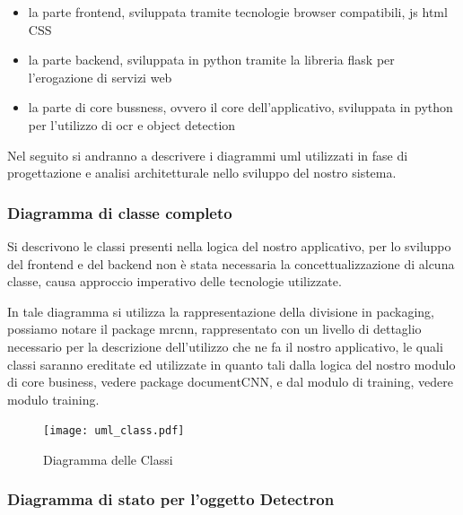 \documentclass[12pt,a4paper]{article}
\begin{document}
\begin{itemize}
    \item la parte frontend, sviluppata tramite tecnologie browser
        compatibili, js html CSS
    \item la parte backend, sviluppata in python tramite la libreria
        flask per l'erogazione di servizi web
    \item la parte di core bussness, ovvero il core dell'applicativo,
        sviluppata in python per l'utilizzo di ocr e object
        detection
\end{itemize}

Nel seguito si andranno a descrivere i diagrammi uml utilizzati in fase
di progettazione e analisi architetturale nello sviluppo del nostro
sistema.


\subsubsection{Diagramma di classe completo}

Si descrivono le classi presenti nella logica del nostro applicativo,
per lo sviluppo del frontend e del backend non è stata necessaria la
concettualizzazione di alcuna classe, causa approccio imperativo delle
tecnologie utilizzate.

In tale diagramma si utilizza la rappresentazione della divisione in
packaging, possiamo notare il package mrcnn, rappresentato con un livello di dettaglio
necessario per la descrizione dell'utilizzo che ne fa il nostro
applicativo, le quali classi saranno ereditate ed utilizzate in quanto
tali dalla logica del nostro modulo di core business, vedere package
documentCNN, e dal modulo di training, vedere modulo training.

\begin{figure}[H]
    \caption{Diagramma delle Classi}
    \centering
    \texttt{[image: uml\_class.pdf]}
\end{figure}


\subsubsection{Diagramma di stato per l'oggetto Detectron}
\end{document}
